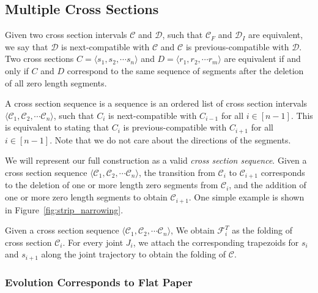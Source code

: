 \subsection{Multiple Cross Sections}
\label{sec:intervals}


\begin{definition}
\label{def:compatible}
Given two cross section intervals $\mathcal C$ and $\mathcal D$, such that $\mathcal C_F$ and $\mathcal D_I$ are equivalent,
we say that $\mathcal D$ is next-compatible with $\mathcal C$ and $\mathcal C$ is previous-compatible with $\mathcal D$.
Two cross sections $C = \langle s_1, s_2,\cdots s_n \rangle$ and $D = \langle r_1, r_2,\cdots r_m \rangle$ are equivalent
if and only if $C$ and $D$ correspond to the same sequence of segments after the deletion of all zero length segments.
\end{definition}

\begin{definition}
\label{def:cross_section_sequence}
A cross section sequence is a sequence is an ordered list of cross section intervals $ \langle \mathcal C_1, \mathcal C_2,\cdots \mathcal C_n \rangle$,
such that $C_{i}$ is next-compatible with $C_{i-1}$ for all $i\in [n-1]$.
This is equivalent to stating that $C_{i}$ is previous-compatible with $C_{i+1}$ for all $i\in [n-1]$.
Note that we do not care about the directions of the segments.
\end{definition}

We will represent our full construction as a valid \emph{cross section sequence}.
Given a cross section sequence $\langle \mathcal C_1, \mathcal C_2,\cdots \mathcal C_n \rangle$,
the transition from $\mathcal C_i$ to $\mathcal C_{i+1}$ corresponds to the deletion of one or more
length zero segments from $\mathcal C_i$, and the addition of one or more zero length segments to obtain $\mathcal C_{i+1}$.
One simple example is shown in Figure~\ref{fig:strip_narrowing}.

\begin{definition}
\label{def:sequence_folding}
Given a cross section sequence $\langle \mathcal C_1, \mathcal C_2,\cdots \mathcal C_n \rangle$,
We obtain $\mathcal F_i^T$ as the folding of cross section $\mathcal C_i$.
For every joint $J_i$, we attach the corresponding trapezoids for $s_i$ and $s_{i+1}$
along the joint trajectory to obtain the folding of $\mathcal C$.
\end{definition}

\subsubsection{Evolution Corresponds to Flat Paper}
\label{sec:flat}

